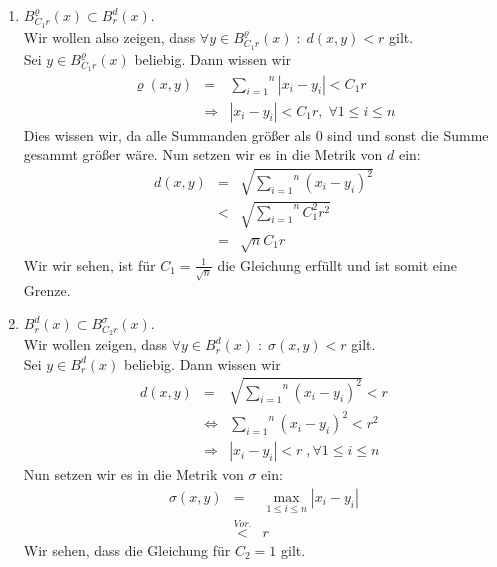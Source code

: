 \begin{enumerate}[\itshape a)]

    \item $B^\varrho_{C_1r} (x) \subset B^d_r (x)$.\\
        Wir wollen also zeigen, dass $\forall y \in B_{C_1r}^\varrho (x) \; : \; d(x,y) < r$ gilt.\\
        Sei $y \in B_{C_1r}^\varrho (x)$ beliebig. Dann wissen wir
        $$\begin{array}{rcl}
            \varrho (x,y)   &=& \overset{n}{\underset{i=1}{\sum}} |x_i - y_i| < C_1r\\
                            &\Rightarrow& |x_i - y_i| < C_1r, \; \forall 1 \leq i \leq n
        \end{array}$$
        Dies wissen wir, da alle Summanden größer als $0$ sind und sonst die Summe gesammt größer wäre.
        Nun setzen wir es in die Metrik von $d$ ein:
        $$\begin{array}{rcl}
            d(x,y)  &=& \sqrt{\overset{n}{\underset{i=1}{\sum}} (x_i - y_i)^2}\\
                    &<& \sqrt{\overset{n}{\underset{i=1}{\sum}} C_1^2 r^2}\\
                    &=& \sqrt{n} C_1 r
        \end{array}$$
        Wir wir sehen, ist für $C_1 = \frac{1}{\sqrt{n}}$ die Gleichung erfüllt und ist somit eine Grenze.

\pagebreak

    \item $B_r^d (x) \subset B_{C_2r}^\sigma (x)$.\\
        Wir wollen zeigen, dass $\forall y \in B_r^d (x) \; : \; \sigma (x,y) < r$ gilt.\\
        Sei $y \in B_r^d (x)$ beliebig. Dann wissen wir
        $$\begin{array}{rcl}
            d(x,y)  &=& \sqrt{\overset{n}{\underset{i=1}{\sum}} (x_i - y_i)^2} < r\\
                    &\Leftrightarrow& \overset{n}{\underset{i=1}{\sum}} (x_i - y_i)^2 < r^2\\
                    &\Rightarrow& |x_i - y_i| < r \; , \forall 1 \leq i \leq n 
        \end{array}$$
        Nun setzen wir es in die Metrik von $\sigma$ ein:
        $$\begin{array}{rcl}
            \sigma (x,y)    &=& \underset{1 \leq i \leq n}{\max} |x_i - y_i|\\
                            &\stackrel{Vor.}{<}& r
        \end{array}$$
        Wir sehen, dass die Gleichung für $C_2 = 1$ gilt.


\end{enumerate}
